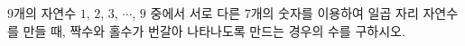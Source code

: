 \hspace*{2mm}\begin{minipage}[t]{\dimexpr\linewidth-2mm\relax}\vspace{0pt}
$9$개의 자연수 $1$, $2$, $3$, $\cdots$, $9$ 중에서 서로 다른 $7$개의 숫자를 이용하여 일곱 자리 자연수를 만들 때, 짝수와 홀수가 번갈아 나타나도록 만드는 경우의 수를 구하시오.\end{minipage}
